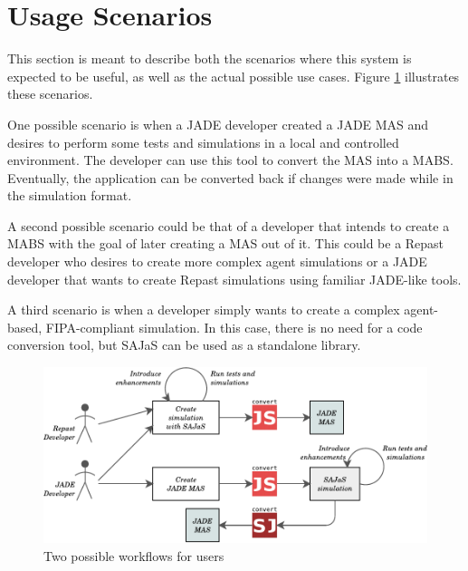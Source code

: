 \section{Usage Scenarios}
\label{sec:solution-scenarios}
This section is meant to describe both the scenarios where this system is expected to be useful, as well as the actual possible use cases. Figure \ref{fig:prototypeFlow} illustrates these scenarios.

One possible scenario is when a JADE developer created a JADE MAS and desires to perform some tests and simulations in a local and controlled environment. The developer can use this tool to convert the MAS into a MABS. Eventually, the application can be converted back if changes were made while in the simulation format.

A second possible scenario could be that of a developer that intends to create a MABS with the goal of later creating a MAS out of it. This could be a Repast developer who desires to create more complex agent simulations or a JADE developer that wants to create Repast simulations using familiar JADE-like tools.

A third scenario is when a developer simply wants to create a complex agent-based, FIPA-compliant simulation. In this case, there is no need for a code conversion tool, but SAJaS can be used as a standalone library.

\begin{figure}
	\centering
	\includegraphics[width=0.9\linewidth]{figures/prototypeFlow.pdf}
	\caption{
		Two possible workflows for \apiname{} users
	}
	\label{fig:prototypeFlow}
\end{figure}

